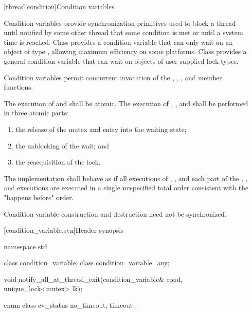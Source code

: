 [thread.condition]{Condition variables}

\pnum
Condition variables provide synchronization primitives used to block a thread until
notified by some other thread that some condition is met or until a system time is
reached. Class  provides a condition variable that can only
wait on an object of type , allowing maximum efficiency on some
platforms. Class  provides a general condition variable
that can wait on objects of user-supplied lock types.

\pnum
Condition variables permit concurrent invocation of the , ,
,  and  member functions.

\pnum
The execution of  and  shall be atomic. The
execution of , , and  shall be performed
in three atomic parts:

\begin{enumerate}
\item the release of the mutex and entry into the waiting state;
\item the unblocking of the wait; and
\item the reacquisition of the lock.
\end{enumerate}

\pnum
The implementation shall behave as if all executions of , , and each
part of the , , and  executions are
executed in a single unspecified total order consistent with the "happens before" order.

\pnum
Condition variable construction and destruction need not be synchronized.

[condition_variable.syn]{Header  synopsis}
%
%

%
\begin{codeblock}
namespace std {
  class condition_variable;
  class condition_variable_any;

  void notify_all_at_thread_exit(condition_variable& cond, unique_lock<mutex> lk);

  enum class cv_status { no_timeout, timeout };
}
\end{codeblock}

